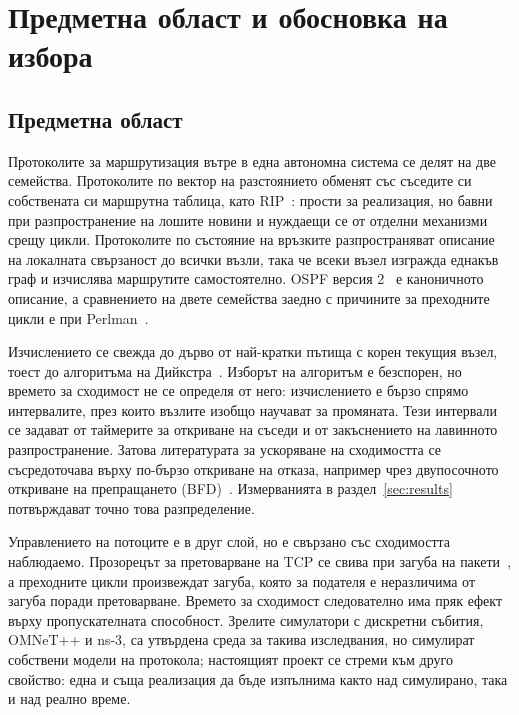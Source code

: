 \section{Предметна област и обосновка на избора}
\label{sec:literature}

\subsection{Предметна област}

Протоколите за маршрутизация вътре в една автономна система се делят на две семейства.
Протоколите по вектор на разстоянието обменят със съседите си собствената си маршрутна
таблица, като RIP~\cite{rfc1058}: прости за реализация, но бавни при разпространение на
лошите новини и нуждаещи се от отделни механизми срещу цикли. Протоколите по състояние на
връзките разпространяват описание на локалната свързаност до всички възли, така че всеки възел
изгражда еднакъв граф и изчислява маршрутите самостоятелно. OSPF версия 2~\cite{rfc2328} е
каноничното описание, а сравнението на двете семейства заедно с причините за преходните цикли
е при Perlman~\cite{perlman2000}.

Изчислението се свежда до дърво от най-кратки пътища с корен текущия възел, тоест до
алгоритъма на Дийкстра~\cite{dijkstra1959}. Изборът на алгоритъм е безспорен, но времето за
сходимост не се определя от него: изчислението е бързо спрямо интервалите, през които възлите
изобщо научават за промяната. Тези интервали се задават от таймерите за откриване на съседи и
от закъснението на лавинното разпространение. Затова литературата за ускоряване на сходимостта
се съсредоточава върху по-бързо откриване на отказа, например чрез двупосочното откриване на
препращането (BFD)~\cite{rfc5880}. Измерванията в раздел~\ref{sec:results} потвърждават точно
това разпределение.

Управлението на потоците е в друг слой, но е свързано със сходимостта наблюдаемо. Прозорецът
за претоварване на TCP се свива при загуба на пакети~\cite{jacobson1988,rfc5681}, а преходните
цикли произвеждат загуба, която за подателя е неразличима от загуба поради претоварване.
Времето за сходимост следователно има пряк ефект върху пропускателната способност. Зрелите
симулатори с дискретни събития, OMNeT++ и ns-3, са утвърдена среда за такива изследвания, но
симулират собствени модели на протокола; настоящият проект се стреми към друго свойство: една
и съща реализация да бъде изпълнима както над симулирано, така и над реално време.

